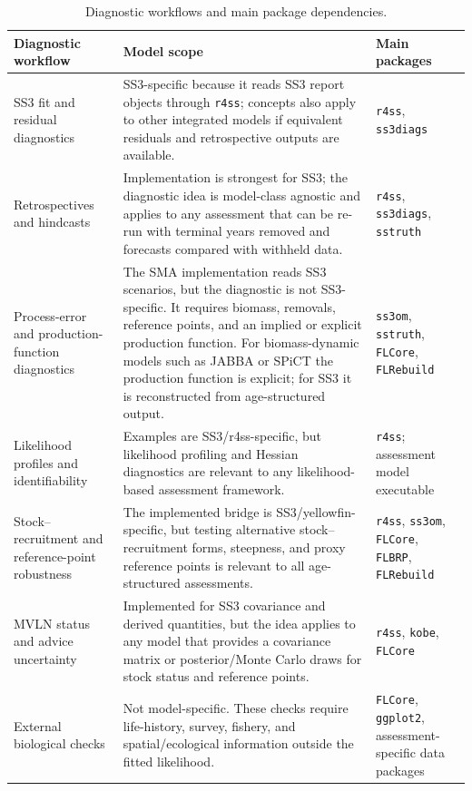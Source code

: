 \documentclass[11pt,a4paper]{article}
\begin{document}
\begin{table}[H]
  \centering
  \caption{Diagnostic workflows and main package dependencies.}
  \label{tab:diag-availability}
  \scriptsize
  \begin{tabularx}{\textwidth}{>{\raggedright\arraybackslash}p{3.0cm}>{\raggedright\arraybackslash}X>{\raggedright\arraybackslash}p{4.2cm}}
    \toprule
    Diagnostic workflow & Model scope & Main packages \\
    \midrule
    SS3 fit and residual diagnostics & SS3-specific because it reads SS3 report objects through \texttt{r4ss}; concepts also apply to other integrated models if equivalent residuals and retrospective outputs are available. & \texttt{r4ss}, \texttt{ss3diags} \\
    Retrospectives and hindcasts & Implementation is strongest for SS3; the diagnostic idea is model-class agnostic and applies to any assessment that can be re-run with terminal years removed and forecasts compared with withheld data. & \texttt{r4ss}, \texttt{ss3diags}, \texttt{sstruth} \\
    Process-error and production-function diagnostics & The SMA implementation reads SS3 scenarios, but the diagnostic is not SS3-specific. It requires biomass, removals, reference points, and an implied or explicit production function. For biomass-dynamic models such as JABBA or SPiCT the production function is explicit; for SS3 it is reconstructed from age-structured output. & \texttt{ss3om}, \texttt{sstruth}, \texttt{FLCore}, \texttt{FLRebuild} \\
    Likelihood profiles and identifiability & Examples are SS3/r4ss-specific, but likelihood profiling and Hessian diagnostics are relevant to any likelihood-based assessment framework. & \texttt{r4ss}; assessment model executable \\
    Stock--recruitment and reference-point robustness & The implemented bridge is SS3/yellowfin-specific, but testing alternative stock--recruitment forms, steepness, and proxy reference points is relevant to all age-structured assessments. & \texttt{r4ss}, \texttt{ss3om}, \texttt{FLCore}, \texttt{FLBRP}, \texttt{FLRebuild} \\
    MVLN status and advice uncertainty & Implemented for SS3 covariance and derived quantities, but the idea applies to any model that provides a covariance matrix or posterior/Monte Carlo draws for stock status and reference points. & \texttt{r4ss}, \texttt{kobe}, \texttt{FLCore} \\
    External biological checks & Not model-specific. These checks require life-history, survey, fishery, and spatial/ecological information outside the fitted likelihood. & \texttt{FLCore}, \texttt{ggplot2}, assessment-specific data packages \\
    \bottomrule
  \end{tabularx}
\end{table}
\end{document}
